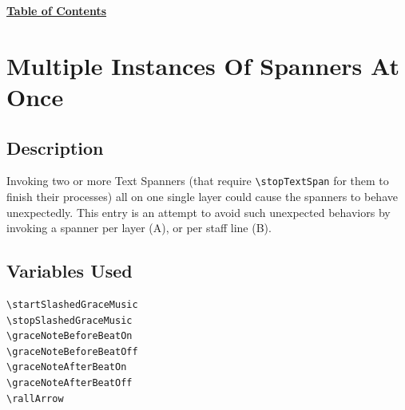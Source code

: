 \hyperref[sec:toc]{\textbf{Table of Contents}}

\vfill \break


\section {Multiple Instances Of Spanners At Once}
\label{sec:comb_spanners}
\hfill
{}
\hfill

\subsection{Description}
Invoking two or more Text Spanners (that require \verb|\stopTextSpan| for them to finish their processes) all on one single layer could cause the spanners to behave unexpectedly. This entry is an attempt to avoid such unexpected behaviors by invoking a spanner per layer (A), or per staff line (B).

\subsection{Variables Used}
\begin{verbatim}
\startSlashedGraceMusic
\stopSlashedGraceMusic
\graceNoteBeforeBeatOn
\graceNoteBeforeBeatOff
\graceNoteAfterBeatOn
\graceNoteAfterBeatOff
\rallArrow

\end{verbatim}
